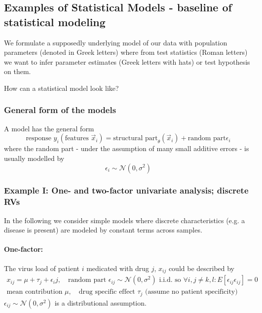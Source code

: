 \subsection{Examples of Statistical Models - baseline of statistical modeling}
We formulate a supposedly underlying model of our data with population parameters (denoted in Greek letters)
where from test statistics (Roman letters) we want to infer parameter estimates (Greek letters with hats)
or test hypothesis on them.

How can a statistical model look like?

\subsubsection{General form of the models}
A model has the general form
\begin{equation}
    \text{response } y_i(\text{features } \vec{x}_i) = \text{structural part}_\theta (\vec{x}_i) + \text{random part} \epsilon_i
\end{equation}
where the random part - under the assumption of many small additive errors - is usually modelled by
\begin{equation}
    \epsilon_i \sim \mathcal{N}(0,\sigma^2)
\end{equation}

\subsubsection{Example I: One- and two-factor univariate analysis; discrete RVs\skipthis}
In the following we consider simple models where discrete characteristics (e.g. a disease is present)
are modeled by constant terms across samples.
\paragraph*{One-factor:} The virus load of patient $i$ medicated with drug $j$, $x_{ij}$ could be described by
\begin{equation}
    \begin{gathered}
        x_{ij} = \mu + \tau_j + \epsilon_ij, \quad \text{random part } \epsilon_{ij} \sim \mathcal{N}(0,\sigma^2) \text{ i.i.d. so } \forall i,j \neq k,l: E[\epsilon_{ij}\epsilon_{ij}] = 0 \\
        \text{mean contribution } \mu, \quad \text{drug specific effect } \tau_j \text{ (assume no patient specificity)}
    \end{gathered}
\end{equation}
$\epsilon_{ij} \sim \mathcal{N}(0,\sigma^2)$ is a distributional assumption.
